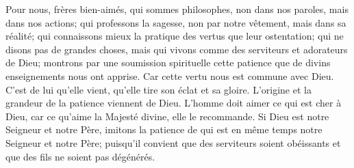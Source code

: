 Pour nous, frères bien-aimés,
	qui sommes philosophes, non dans nos paroles, mais dans nos actions;
	qui professons la sagesse, non par notre vêtement, mais dans sa réalité;
	qui connaissons mieux la pratique des vertus que leur ostentation;
	qui ne disons pas de grandes choses,
	mais qui vivons comme des serviteurs et adorateurs de Dieu;
	montrons par une soumission spirituelle cette patience
	que de divins enseignements nous ont apprise.
Car cette vertu nous est commune avec Dieu.
	C’est de lui qu’elle vient, qu’elle tire son éclat et sa gloire.
	L’origine et la grandeur de la patience viennent de Dieu.
L’homme doit aimer ce qui est cher à Dieu,
	car ce qu’aime la Majesté divine, elle le recommande.
Si Dieu est notre Seigneur et notre Père,
	imitons la patience de qui est en même temps notre Seigneur et notre Père;
	puisqu’il convient que des serviteurs soient obéissants
	et que des fils ne soient pas dégénérés.
